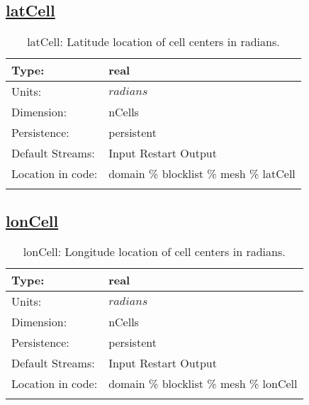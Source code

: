 \subsection[latCell]{\hyperref[sec:var_tab_mesh]{latCell}}
\label{subsec:var_sec_mesh_latCell}
\begin{center}
\begin{longtable}{| p{2.0in} | p{4.0in} |}
        \hline 
        Type: & real \\
        \hline 
        Units: & $radians$ \\
        \hline 
        Dimension: & nCells \\
        \hline 
        Persistence: & persistent \\
        \hline 
		 Default Streams: & Input Restart Output  \\
        \hline 
		 Location in code: & domain \% blocklist \% mesh \% latCell \\
		 \hline 
    \caption{latCell: Latitude location of cell centers in radians.}
\end{longtable}
\end{center}
\subsection[lonCell]{\hyperref[sec:var_tab_mesh]{lonCell}}
\label{subsec:var_sec_mesh_lonCell}
\begin{center}
\begin{longtable}{| p{2.0in} | p{4.0in} |}
        \hline 
        Type: & real \\
        \hline 
        Units: & $radians$ \\
        \hline 
        Dimension: & nCells \\
        \hline 
        Persistence: & persistent \\
        \hline 
		 Default Streams: & Input Restart Output  \\
        \hline 
		 Location in code: & domain \% blocklist \% mesh \% lonCell \\
		 \hline 
    \caption{lonCell: Longitude location of cell centers in radians.}
\end{longtable}
\end{center}
